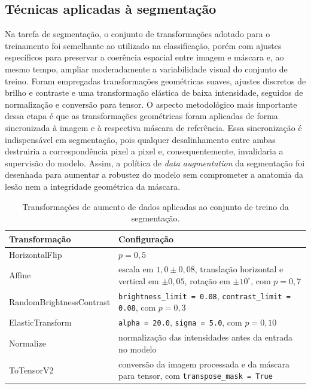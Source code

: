 \documentclass[tcc,capa]{texufpel}
\begin{document}
\subsection{Técnicas aplicadas à segmentação}

Na tarefa de segmentação, o conjunto de transformações adotado para o treinamento foi semelhante ao utilizado na classificação, porém com ajustes específicos para preservar a coerência espacial entre imagem e máscara e, ao mesmo tempo, ampliar moderadamente a variabilidade visual do conjunto de treino. Foram empregadas transformações geométricas suaves, ajustes discretos de brilho e contraste e uma transformação elástica de baixa intensidade, seguidos de normalização e conversão para tensor. O aspecto metodológico mais importante dessa etapa é que as transformações geométricas foram aplicadas de forma sincronizada à imagem e à respectiva máscara de referência. Essa sincronização é indispensável em segmentação, pois qualquer desalinhamento entre ambas destruiria a correspondência pixel a pixel e, consequentemente, invalidaria a supervisão do modelo. Assim, a política de \textit{data augmentation} da segmentação foi desenhada para aumentar a robustez do modelo sem comprometer a anatomia da lesão nem a integridade geométrica da máscara.

\begin{table}[htbp]
	\centering
	\caption{Transformações de aumento de dados aplicadas ao conjunto de treino da segmentação.}
	\label{tab:augmentation_segmentation}
	\begin{tabular}{p{4.2cm} p{9.5cm}}
		\hline
		\textbf{Transformação} & \textbf{Configuração} \\[0.2cm]
		\hline
		HorizontalFlip & \(p = 0{,}5\) \\
		Affine & escala em \(1{,}0 \pm 0{,}08\), translação horizontal e vertical em \(\pm 0{,}05\), rotação em \(\pm 10^\circ\), com \(p = 0{,}7\) \\
		RandomBrightnessContrast & \texttt{brightness\_limit = 0.08}, \texttt{contrast\_limit = 0.08}, com \(p = 0{,}3\) \\
		ElasticTransform & \texttt{alpha = 20.0}, \texttt{sigma = 5.0}, com \(p = 0{,}10\) \\
		Normalize & normalização das intensidades antes da entrada no modelo \\
		ToTensorV2 & conversão da imagem processada e da máscara para tensor, com \texttt{transpose\_mask = True} \\
		\hline
	\end{tabular}
\end{table}
\end{document}
